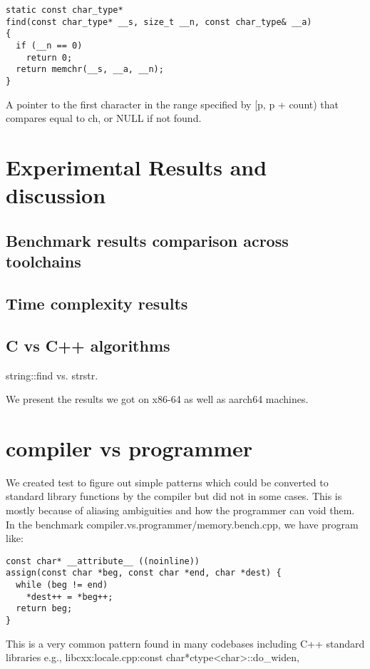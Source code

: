 \documentclass{sig-alternate}
\begin{document}
\begin{verbatim}
static const char_type*
find(const char_type* __s, size_t __n, const char_type& __a)
{
  if (__n == 0)
    return 0;
  return memchr(__s, __a, __n);
}
\end{verbatim}

A pointer to the first character in the range specified by [p, p + count) that
  compares equal to ch, or NULL if not found.


\section{Experimental Results and discussion}
\label{sec:experiments}

\subsection{Benchmark results comparison across toolchains}

\subsection{Time complexity results}

\subsection{C vs C++ algorithms}
string::find vs. strstr.

We present the results we got on x86-64 as well as aarch64 machines.

\section{compiler vs programmer}
We created test to figure out simple patterns which could be converted to
standard library functions by the compiler but did not in some cases. This is
mostly because of aliasing ambiguities and how the programmer can void them.  In
the benchmark compiler.vs.programmer/memory.bench.cpp, we have program like:

\begin{verbatim}
const char* __attribute__ ((noinline))
assign(const char *beg, const char *end, char *dest) {
  while (beg != end)
    *dest++ = *beg++;
  return beg;
}
\end{verbatim}

This is a very common pattern found in many codebases including C++ standard
libraries e.g., libcxx:locale.cpp:const char*ctype<char>::do\_widen,
\end{document}
